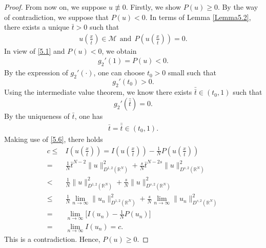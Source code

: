 \documentclass[12pt,a4paper,reqno]{amsart}
\numberwithin{equation}{section}
\begin{document}
\begin{proof}
From now on, we suppose $u\not\equiv0$.
Firstly, we show
$P(u)\geqslant0$.
By the way of contradiction, we suppose that
$P(u)<0$.
In terms of Lemma
\ref{Lemma5.2},
there exists a unique
$\bar{t}>0$
such that
\begin{equation*}
\begin{aligned}
u\left(\frac{x}{\bar{t}}\right)\in\mathcal{M}
~~\mathrm{and}~~
P\left(u\left(\frac{x}{\bar{t}}\right)\right)=0.
\end{aligned}
\end{equation*}
In view of
\eqref{5.1}
and
$P(u)<0$,
we obtain
\begin{equation*}
\begin{aligned}
g_{2}'(1)=P(u)<0.
\end{aligned}
\end{equation*}
By the expression of $g_{2}'(\cdot)$,
one can choose
$t_{0}>0$ small such that
\begin{equation*}
g_{2}'(t_{0})>0.
\end{equation*}
Using the intermediate value theorem, we know there exists
$\bar{\bar{t}}\in(t_{0},1)$
such that
\begin{equation*}
g_{2}'(\bar{\bar{t}})=0.
\end{equation*}
By the uniqueness of
$\bar{t}$,
one has
\begin{equation}\label{5.6}
\begin{aligned}
\bar{t}
=
\bar{\bar{t}}
\in(t_{0},1).
\end{aligned}
\end{equation}
Making use of \eqref{5.6},
there holds
\begin{equation*}
\begin{aligned}
c
\leqslant&
I\left(u\left(\frac{x}{\bar{t}}\right)\right)
=
I\left(u\left(\frac{x}{\bar{t}}\right)\right)
-
\frac{1}{N}
P\left(u\left(\frac{x}{\bar{t}}\right)\right)\\
=&
\frac{1}{N}
\bar{t}^{N-2}
\|u\|_{D^{1,2}(\mathbb{R}^{N})}^{2}
+
\frac{s}{N}
\bar{t}^{N-2s}
\|u\|_{D^{s,2}(\mathbb{R}^{N})}^{2}
\\
<&
\frac{1}{N}
\|u\|_{D^{1,2}(\mathbb{R}^{N})}^{2}
+
\frac{s}{N}
\|u\|_{D^{s,2}(\mathbb{R}^{N})}^{2}\\
\leqslant&
\frac{1}{N}
\lim_{n\rightarrow\infty}
\|u_{n}\|_{D^{1,2}(\mathbb{R}^{N})}^{2}
+
\frac{s}{N}
\lim_{n\rightarrow\infty}
\|u_{n}\|_{D^{s,2}(\mathbb{R}^{N})}^{2}\\
=&
\lim_{n\rightarrow\infty}
\bigg[
I(u_{n})
-
\frac{1}{N}
P(u_{n})
\bigg]\\
=&
\lim_{n\rightarrow\infty}
I(u_{n})
=
c.
\end{aligned}
\end{equation*}
This is a contradiction.
Hence,
$P(u)\geqslant0$.


\end{proof}
\end{document}
